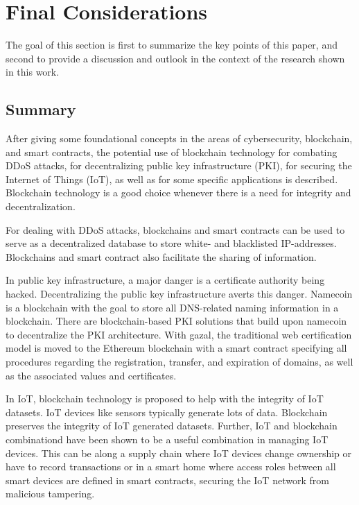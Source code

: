 \section{Final Considerations}

The goal of this section is first to summarize the key points of this paper, and second to provide a discussion and outlook in the context of the research shown in this work.

\subsection{Summary}

After giving some foundational concepts in the areas of cybersecurity, blockchain, and smart contracts, the potential use of blockchain technology for combating DDoS attacks, for decentralizing public key infrastructure (PKI), for securing the Internet of Things (IoT), as well as for some specific applications is described. Blockchain technology is a good choice whenever there is a need for integrity and decentralization.

For dealing with DDoS attacks, blockchains and smart contracts can be used to serve as a decentralized database to store white- and blacklisted IP-addresses. Blockchains and smart contract also facilitate the sharing of information.

In public key infrastructure, a major danger is a certificate authority being hacked. Decentralizing the public key infrastructure averts this danger. Namecoin is a blockchain with the goal to store all DNS-related naming information in a blockchain. There are blockchain-based PKI solutions that build upon namecoin to decentralize the PKI architecture.
With gazal, the traditional web certification model is moved to the Ethereum blockchain with a smart contract specifying all procedures regarding the registration, transfer, and expiration of domains, as well as the associated values and certificates.

In IoT, blockchain technology is proposed to help with the integrity of IoT datasets. IoT devices like sensors typically generate lots of data. Blockchain preserves the integrity of IoT generated datasets. Further, IoT and blockchain combinationd have been shown to be a useful
combination in managing IoT devices. This can be along a supply chain where IoT devices change ownership or have to record transactions or in a smart home
where access roles between all smart devices are defined in smart contracts, securing the IoT network from malicious tampering.


